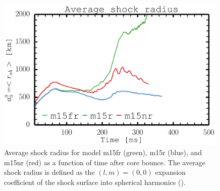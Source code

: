 \begin{figure}[H!]         
\centering                            
\includegraphics[width=0.99\textwidth]{./images/paper2/rsh.pdf}
\caption{Average shock radius for model m15fr (green), m15r (blue), and m15nr (red) as a function of 
time after core bounce. The average shock radius is defined as the $(l,m) = (0,0)$ expansion coefficient of the shock surface into 
spherical harmonics (). \label{figp2:rsh}}
\end{figure}
